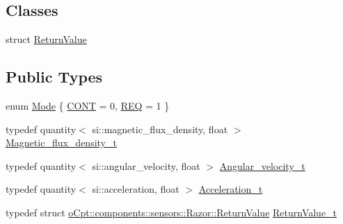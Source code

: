 \subsection*{Classes}
\begin{DoxyCompactItemize}
\item 
struct \hyperlink{structo_cpt_1_1components_1_1sensors_1_1_razor_1_1_return_value}{Return\+Value}
\end{DoxyCompactItemize}
\subsection*{Public Types}
\begin{DoxyCompactItemize}
\item 
enum \hyperlink{classo_cpt_1_1components_1_1sensors_1_1_razor_afed258e485aaaf9193a57d649ccb159b}{Mode} \{ \hyperlink{classo_cpt_1_1components_1_1sensors_1_1_razor_afed258e485aaaf9193a57d649ccb159ba512aed2858fbf6bf5c12ea88da01d5e2}{C\+O\+NT} = 0, 
\hyperlink{classo_cpt_1_1components_1_1sensors_1_1_razor_afed258e485aaaf9193a57d649ccb159ba44c61c0088038c1222adbddd1664555b}{R\+EQ} = 1
 \}
\item 
typedef quantity$<$ si\+::magnetic\+\_\+flux\+\_\+density, float $>$ \hyperlink{classo_cpt_1_1components_1_1sensors_1_1_razor_ae8fa7bff60dd03d8603e7c7d757ae061}{Magnetic\+\_\+flux\+\_\+density\+\_\+t}
\item 
typedef quantity$<$ si\+::angular\+\_\+velocity, float $>$ \hyperlink{classo_cpt_1_1components_1_1sensors_1_1_razor_a2667055c5eda244f9dd5235159d86184}{Angular\+\_\+velocity\+\_\+t}
\item 
typedef quantity$<$ si\+::acceleration, float $>$ \hyperlink{classo_cpt_1_1components_1_1sensors_1_1_razor_a4ebbe9ca2661c07f9665a32a7dd38e0c}{Acceleration\+\_\+t}
\item 
typedef struct \hyperlink{structo_cpt_1_1components_1_1sensors_1_1_razor_1_1_return_value}{o\+Cpt\+::components\+::sensors\+::\+Razor\+::\+Return\+Value} \hyperlink{classo_cpt_1_1components_1_1sensors_1_1_razor_aab55c5b1a96ce97421e4696599549954}{Return\+Value\+\_\+t}
\end{DoxyCompactItemize}
